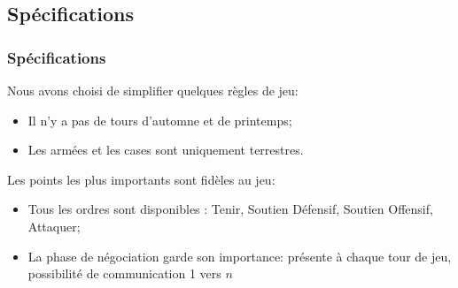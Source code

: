 \subsection{Spécifications}
	\begin{frame}
		\frametitle{Spécifications}
		Nous avons choisi de simplifier quelques règles de jeu:
		\begin{itemize}
			\item Il n'y a pas de tours d'automne et de printemps;
			\item Les armées et les cases sont uniquement terrestres.
		\end{itemize}\bigskip

		Les points les plus importants sont fidèles au jeu:
		\begin{itemize}
			\item Tous les ordres sont disponibles : Tenir, Soutien Défensif, Soutien Offensif, Attaquer;
			\item La phase de négociation garde son importance: présente à chaque tour de jeu, possibilité de communication 1 vers $n$
		\end{itemize}
	\end{frame}
